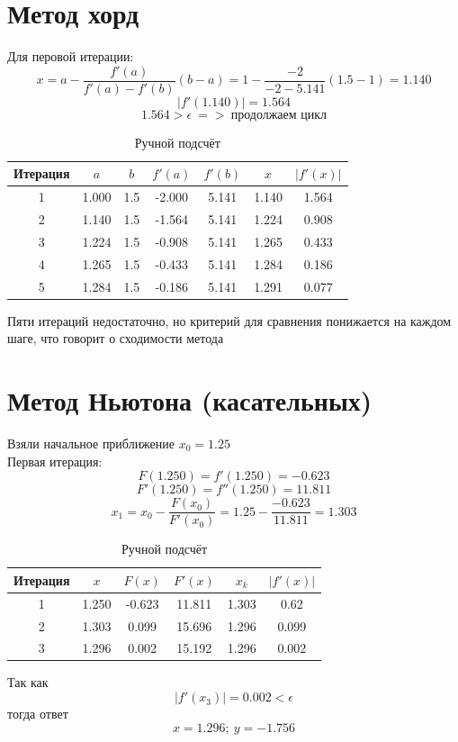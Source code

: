 \documentclass{article}
\begin{document}
\section{Метод хорд}
Для перовой итерации:
\[x = a - \frac{f'(a)}{f'(a)-f'(b)}(b-a) = 1 - \frac{-2}{-2-5.141}(1.5 -1) = 1.140 \]
\[|f'(1.140)| = 1.564\]
\[1.564 > \epsilon\ => \ \text{продолжаем цикл}\]
\begin{table}[H]
    \centering
    \begin{tabular}{|c|c|c|c|c|c|c|}
    \hline
    Итерация & $a$    & $b$  & $f'(a)$ & $f'(b)$ & $x$    & $|f'(x)|$ \\ \hline
    1     & 1.000  & 1.5  & -2.000  & 5.141   & 1.140  & 1.564     \\
    2     & 1.140  & 1.5  & -1.564  & 5.141   & 1.224  & 0.908     \\
    3     & 1.224  & 1.5  & -0.908  & 5.141   & 1.265  & 0.433     \\
    4     & 1.265  & 1.5  & -0.433  & 5.141   & 1.284  & 0.186     \\
    5     & 1.284  & 1.5  & -0.186  & 5.141   & 1.291  & 0.077     \\ \hline
    \end{tabular}
    \caption{Ручной подсчёт}
    \label{tab:newton-raphson-summary}
\end{table}
Пяти итераций недостаточно, но критерий для сравнения понижается на каждом шаге, что говорит о сходимости метода

\section{Метод Ньютона (касательных)}
Взяли начальное приближение $x_0 = 1.25$\\
Первая итерация:
\[F(1.250) = f'(1.250) = -0.623\]
\[F'(1.250) = f''(1.250) = 11.811\]
\[x_1 = x_0 - \frac{F(x_0)}{F'(x_0)} = 1.25 - \frac{-0.623}{11.811} = 1.303\]
\begin{table}[H]
    \centering
    \begin{tabular}{|c|c|c|c|c|c|}
    \hline
    Итерация & $x$     & $F(x)$  & $F'(x)$  & $x_k$  & $|f'(x)|$                 \\ \hline
    1        & 1.250   & -0.623   & 11.811    & 1.303    & 0.62            \\
    2        & 1.303   & 0.099    & 15.696    & 1.296    & 0.099       \\
    3        & 1.296   & 0.002    & 15.192    & 1.296    & 0.002        \\ \hline
    \end{tabular}
    \caption{Ручной подсчёт}
    \label{tab:optimization-method-summary}
\end{table}

Так как 
\[|f'(x_3)| = 0.002 < \epsilon\]
тогда ответ
\[x = 1.296; \ y = -1.756\]
\end{document}
